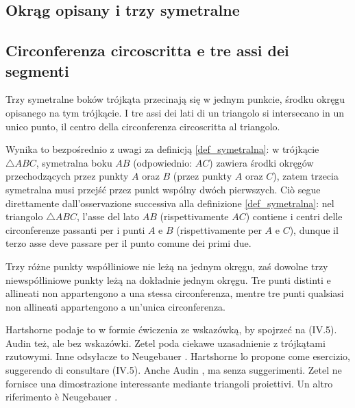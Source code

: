 
%

\subsection{Okrąg opisany i trzy symetralne} %
\subsection{Circonferenza circoscritta e tre assi dei segmenti} %

\begin{proposition}
    \label{symetralne_przecinaja_sie}
    Trzy symetralne boków trójkąta przecinają się w jednym punkcie, środku okręgu opisanego na tym trójkącie. %
    I tre assi dei lati di un triangolo si intersecano in un unico punto, il centro della circonferenza circoscritta al triangolo. %
\end{proposition}

Wynika to bezpośrednio z uwagi za definicją \ref{def_symetralna}: w trójkącie $\triangle ABC$, symetralna boku $AB$ (odpowiednio: $AC$) zawiera środki okręgów przechodzących przez punkty $A$ oraz $B$ (przez punkty $A$ oraz $C$), zatem trzecia symetralna musi przejść przez punkt wspólny dwóch pierwszych. %
Ciò segue direttamente dall'osservazione successiva alla definizione \ref{def_symetralna}: nel triangolo $\triangle ABC$, l'asse del lato $AB$ (rispettivamente $AC$) contiene i centri delle circonferenze passanti per i punti $A$ e $B$ (rispettivamente per $A$ e $C$), dunque il terzo asse deve passare per il punto comune dei primi due. %

Trzy różne punkty współliniowe nie leżą na jednym okręgu, zaś dowolne trzy niewspółliniowe punkty leżą na dokładnie jednym okręgu. %
Tre punti distinti e allineati non appartengono a una stessa circonferenza, mentre tre punti qualsiasi non allineati appartengono a un'unica circonferenza. %

Hartshorne \cite[s. 16]{hartshorne_2000} podaje to w formie ćwiczenia ze wskazówką, by spojrzeć na (IV.5). %
Audin \cite[s. 61]{audin_2003} też, ale bez wskazówki. %
Zetel \cite[s. 151]{zetel_2020} poda ciekawe uzasadnienie z trójkątami rzutowymi. %
Inne odsyłacze to Neugebauer \cite[s. 19]{neugebauer_2018}. %
Hartshorne \cite[p.~16]{hartshorne_2000} lo propone come esercizio, suggerendo di consultare (IV.5). %
Anche Audin \cite[p.~61]{audin_2003}, ma senza suggerimenti. %
Zetel \cite[p.~151]{zetel_2020} ne fornisce una dimostrazione interessante mediante triangoli proiettivi. %
Un altro riferimento è Neugebauer \cite[p.~19]{neugebauer_2018}. %

